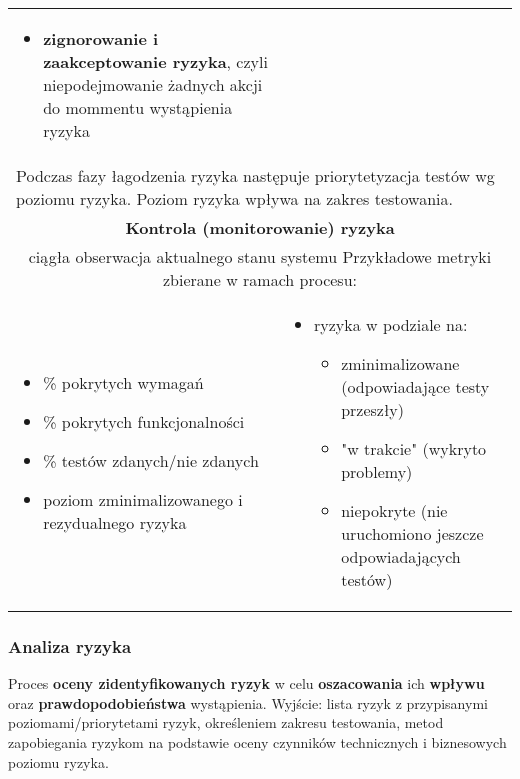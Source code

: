 \documentclass[../main.tex]{subfiles}
\begin{document}
\begin{table}[H]
\begin{center}
\begin{tabular}{| p{8cm}  p{8cm} |}
\begin{itemize}
                    \item \textbf{zignorowanie i zaakceptowanie ryzyka}, czyli niepodejmowanie żadnych akcji do mommentu wystąpienia ryzyka
                \end{itemize}\\
                \multicolumn{2}{|p{16cm}|}{Podczas fazy łagodzenia ryzyka następuje priorytetyzacja testów wg poziomu ryzyka. Poziom ryzyka wpływa na zakres testowania.}\\
                \hline
                \hline
                \multicolumn{2}{|c|}{\textbf{Kontrola (monitorowanie) ryzyka}}\\
                \multicolumn{2}{|c|}{ciągła obserwacja aktualnego stanu systemu Przykładowe metryki zbierane w ramach procesu:}\\
                \hline
                \begin{itemize}
                    \item \% pokrytych wymagań
                    \item \% pokrytych funkcjonalności
                    \item \% testów zdanych/nie zdanych
                    \item poziom zminimalizowanego i rezydualnego ryzyka
                \end{itemize}
                &
                \begin{itemize}
                    \item ryzyka w podziale na:
                    \begin{itemize}
                        \item zminimalizowane (odpowiadające testy przeszły)
                        \item "w trakcie" (wykryto problemy)
                        \item niepokryte (nie uruchomiono jeszcze odpowiadających testów)
                    \end{itemize}
                \end{itemize}\\
                \hline
            \end{tabular}
        \end{center}
    \end{table}

    \subsubsection{Analiza ryzyka}
    Proces \textbf{oceny zidentyfikowanych ryzyk} w celu \textbf{oszacowania} ich \textbf{wpływu}
    oraz \textbf{prawdopodobieństwa} wystąpienia. Wyjście: lista ryzyk z przypisanymi poziomami/priorytetami ryzyk, określeniem zakresu testowania, metod zapobiegania ryzykom na podstawie oceny czynników technicznych i biznesowych poziomu ryzyka.
\end{document}
